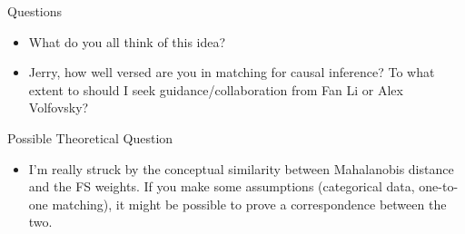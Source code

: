 \documentclass{beamer}
\begin{document}
\begin{frame}{Questions}
	\begin{itemize}
		\item What do you all think of this idea?
		\item Jerry, how well versed are you in matching for causal inference? To what extent to should I seek guidance/collaboration from Fan Li or Alex Volfovsky?
	\end{itemize}
\end{frame}

\begin{frame}{Possible Theoretical Question}
	\begin{itemize}
		\item I'm really struck by the conceptual similarity between Mahalanobis distance and the FS weights. If you make some assumptions (categorical data, one-to-one matching), it might be possible to prove a correspondence between the two. 
	\end{itemize}
\end{frame}
\end{document}
